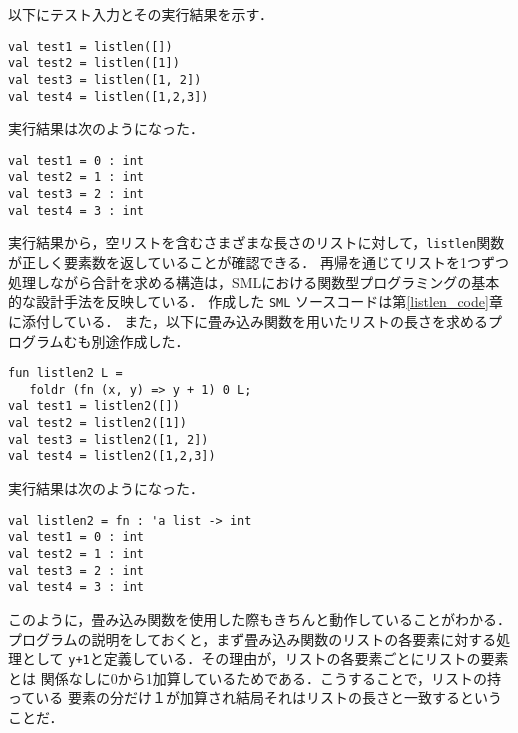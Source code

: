 \documentclass[autodetect-engine,dvi=dvipdfmx,ja=standard,
               a4j,11pt]{bxjsarticle}
\begin{document}
以下にテスト入力とその実行結果を示す．
\begin{Verbatim}
val test1 = listlen([])
val test2 = listlen([1])
val test3 = listlen([1, 2])
val test4 = listlen([1,2,3])
\end{Verbatim}
実行結果は次のようになった．
\begin{Verbatim}
val test1 = 0 : int
val test2 = 1 : int
val test3 = 2 : int
val test4 = 3 : int  
\end{Verbatim}
実行結果から，空リストを含むさまざまな長さのリストに対して，\texttt{listlen}関数が正しく要素数を返していることが確認できる．
再帰を通じてリストを1つずつ処理しながら合計を求める構造は，SMLにおける関数型プログラミングの基本的な設計手法を反映している．
作成した \texttt{SML} ソースコードは第\ref{listlen_code}章に添付している．
また，以下に畳み込み関数を用いたリストの長さを求めるプログラムむも別途作成した．
\begin{verbatim}
fun listlen2 L = 
   foldr (fn (x, y) => y + 1) 0 L;
val test1 = listlen2([])
val test2 = listlen2([1])
val test3 = listlen2([1, 2])
val test4 = listlen2([1,2,3])    
\end{verbatim}
実行結果は次のようになった．
\begin{Verbatim}
val listlen2 = fn : 'a list -> int
val test1 = 0 : int
val test2 = 1 : int
val test3 = 2 : int
val test4 = 3 : int
\end{Verbatim}
このように，畳み込み関数を使用した際もきちんと動作していることがわかる．
プログラムの説明をしておくと，まず畳み込み関数のリストの各要素に対する処理として
\verb|y+1|と定義している．その理由が，リストの各要素ごとにリストの要素とは
関係なしに0から1加算しているためである．こうすることで，リストの持っている
要素の分だけ１が加算され結局それはリストの長さと一致するということだ．
\end{document}
